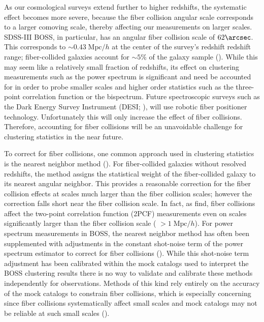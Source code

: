 \documentclass{emulateapj}
\begin{document}
As our cosmological surveys extend further to higher redshifts, the systematic effect becomes more severe, because the fiber collision angular scale corresponds to a larger comoving scale, thereby affecting our measurements on larger scales. SDSS-III BOSS, in particular, has an angular fiber collision scale of $62\arcsec$. This corresponds to $\sim 0.43 \;\mathrm{Mpc}/h$ at the center of the survey's redshift redshift range; fiber-collided galaxies account for $\sim 5\%$ of the galaxy sample (\citealt{Anderson:2012aa}). While this may seem like a relatively small fraction of redshifts, its effect on clustering measurements such as the power spectrum is significant and need be accounted for in order to probe smaller scales and higher order statistics such as the three-point correlation function or the bispectrum. Future spectroscopic surveys such as the Dark Energy Survey Instrument (DESI; \citealt{Schlegel:2011aa, Morales:2012aa, Makarem:2014aa}), will use robotic fiber positioner technology. Unfortunately this will only increase the effect of fiber collisions. Therefore, accounting for fiber collisions will be an unavoidable challenge for clustering statistics in the near future. 

To correct for fiber collisions, one common approach used in clustering statistics is the nearest neighbor method (\citealt{Zehavi:2002aa, Berlind:2006aa, Anderson:2012aa}). For fiber-collided galaxies without resolved redshifts, the method assigns the statistical weight of the fiber-collided galaxy to its nearest angular neighbor. This provides a reasonable correction for the fiber collision effects at scales much larger than the fiber collision scales; however the correction falls short near the fiber collision scale. In fact, as \cite{Zehavi:2005aa} find, fiber collisions affect the two-point correlation function (2PCF) measurements even on scales significantly larger than the fiber collision scale ( $> 1\;\mathrm{Mpc}/h$). For power spectrum measurements in BOSS, the nearest neighbor method has often been supplemented with adjustments in the constant shot-noise term of the power spectrum estimator to correct for fiber collisions (\citealt{Beutler:2014aa, Gil-Marin:2014aa}). While this shot-noise term adjustment has been calibrated within the mock catalogs used to interpret the BOSS clustering results there is no way to validate and calibrate these methods independently for observations. Methods of this kind rely entirely on the accuracy of the mock catalogs to constrain fiber collisions, which is especially concerning since fiber collisions systematically affect small scales and mock catalogs may not be reliable at such small scales (\citealt{Heitmann:2008aa, Schneider:2015aa}). 
\end{document}
